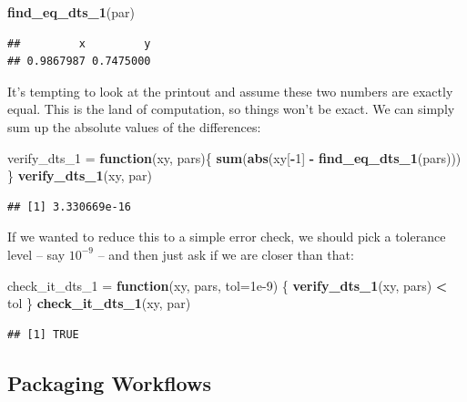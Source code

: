 \documentclass[
]{book}
\newenvironment{Shaded}{\begin{snugshade}}{\end{snugshade}}
\newcommand{\AttributeTok}[1]{\textcolor[rgb]{0.13,0.29,0.53}{#1}}
\newcommand{\ControlFlowTok}[1]{\textcolor[rgb]{0.13,0.29,0.53}{\textbf{#1}}}
\newcommand{\DecValTok}[1]{\textcolor[rgb]{0.00,0.00,0.81}{#1}}
\newcommand{\FloatTok}[1]{\textcolor[rgb]{0.00,0.00,0.81}{#1}}
\newcommand{\FunctionTok}[1]{\textcolor[rgb]{0.13,0.29,0.53}{\textbf{#1}}}
\newcommand{\NormalTok}[1]{#1}
\newcommand{\OtherTok}[1]{\textcolor[rgb]{0.56,0.35,0.01}{#1}}
\newcommand{\SpecialCharTok}[1]{\textcolor[rgb]{0.81,0.36,0.00}{\textbf{#1}}}
\begin{document}
\begin{Shaded}
\begin{Highlighting}[]
\FunctionTok{find\_eq\_dts\_1}\NormalTok{(par) }
\end{Highlighting}
\end{Shaded}

\begin{verbatim}
##         x         y 
## 0.9867987 0.7475000
\end{verbatim}

It's tempting to look at the printout and assume these two numbers are exactly equal. This is the land of computation, so things won't be exact. We can simply sum up the absolute values of the differences:

\begin{Shaded}
\begin{Highlighting}[]
\NormalTok{verify\_dts\_1 }\OtherTok{=} \ControlFlowTok{function}\NormalTok{(xy, pars)\{}
  \FunctionTok{sum}\NormalTok{(}\FunctionTok{abs}\NormalTok{(xy[}\SpecialCharTok{{-}}\DecValTok{1}\NormalTok{] }\SpecialCharTok{{-}} \FunctionTok{find\_eq\_dts\_1}\NormalTok{(pars))) }
\NormalTok{\}}
\FunctionTok{verify\_dts\_1}\NormalTok{(xy, par)}
\end{Highlighting}
\end{Shaded}

\begin{verbatim}
## [1] 3.330669e-16
\end{verbatim}

If we wanted to reduce this to a simple error check, we should pick a tolerance level -- say \(10^{-9}\) -- and then just ask if we are closer than that:

\begin{Shaded}
\begin{Highlighting}[]
\NormalTok{check\_it\_dts\_1 }\OtherTok{=} \ControlFlowTok{function}\NormalTok{(xy, pars, }\AttributeTok{tol=}\FloatTok{1e{-}9}\NormalTok{)}
\NormalTok{\{}
  \FunctionTok{verify\_dts\_1}\NormalTok{(xy, pars) }\SpecialCharTok{\textless{}}\NormalTok{ tol}
\NormalTok{\}}
\FunctionTok{check\_it\_dts\_1}\NormalTok{(xy, par)}
\end{Highlighting}
\end{Shaded}

\begin{verbatim}
## [1] TRUE
\end{verbatim}

\subsection{Packaging Workflows}\label{packaging-workflows}
\end{document}

